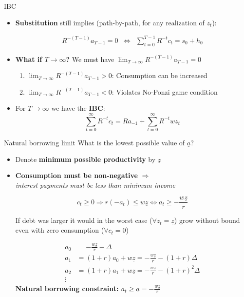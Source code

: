 \documentclass[
  10pt,
  ignorenonframetext,
  aspectratio=43,
  english,
]{beamer}
\providecommand{\tightlist}{%
  \setlength{\itemsep}{0pt}\setlength{\parskip}{0pt}}
\begin{document}
\begin{frame}{IBC}
\protect{}\label{ibc-1}
\begin{itemize}
\item
  \textbf{Substitution} still implies (path-by-path, for any realization
  of \(z_{t}\)):

  \[
    \begin{aligned}
    R^{-(T-1)}a_{T-1}=0 & \Leftrightarrow & \sum^{T-1}_{t=0}R^{-t}c_{t}=s_{0}+h_{0}
    \end{aligned}
    \]
\item
  \textbf{What if \(T\rightarrow\infty\)?} We must have
  \(\lim_{T\rightarrow\infty}R^{-(T-1)}a_{T-1}=0\)

  \begin{enumerate}
  \tightlist
  \item
    \(\lim_{T\rightarrow\infty}R^{-(T-1)}a_{T-1}>0\): Consumption can be
    increased
  \item
    \(\lim_{T\rightarrow\infty}R^{-(T-1)}a_{T-1}<0\): Violates No-Ponzi
    game condition
  \end{enumerate}
\item
  For \(T\rightarrow\infty\) we have the \textbf{IBC}: \[
    \sum^{\infty}_{t=0}R^{-t}c_{t}=Ra_{-1}+\sum^{\infty}_{t=0}R^{-t}wz_{t}
    \]
\end{itemize}
\end{frame}

\begin{frame}{Natural borrowing limit}
\protect{}\label{natural-borrowing-limit}
What is the lowest possible value of \(\underline{a}\)?

\begin{itemize}
\item
  Denote \textbf{minimum possible productivity} by
  \textbf{\(\underline{z}\)}
\item
  \textbf{Consumption must be non-negative} \(\Rightarrow\)\\
  \emph{interest payments must be less than minimum income}

  \[
    c_{t}\geq0\Rightarrow r(-a_{t})\leq w\underline{z}\Leftrightarrow a_{t}\geq-\frac{w\underline{z}}{r}
    \]

  If debt was larger it would in the worst case
  (\(\forall z_{t}=\underline{z}\)) grow without bound even with zero
  consumption (\(\forall c_{t}=0\))

  \[
    \begin{aligned}
    a_{0} & =-\frac{w\underline{z}}{r}-\Delta\\
    a_{1} & =(1+r)a_{0}+w\underline{z}=-\frac{w\underline{z}}{r}-(1+r)\Delta\\
    a_{2} & =(1+r)a_{1}+w\underline{z}=-\frac{w\underline{z}}{r}-(1+r)^{2}\Delta\\
    \vdots
    \end{aligned}
    \] \textbf{Natural borrowing constraint:
  \(a_{t}\geq\underline{a}=-\frac{w\underline{z}}{r}\)}
\end{itemize}
\end{frame}
\end{document}
